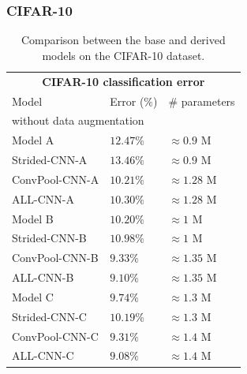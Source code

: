 \documentclass{article} %
\begin{document}
\subsubsection{CIFAR-10}
\begin{table}[h]
\caption{Comparison between the base and derived models on the CIFAR-10 dataset.}
\label{results-cifar10-base}
\begin{center}
\begin{tabular}{lll}
\multicolumn{3}{c}{\bf CIFAR-10 classification error} \\
\multicolumn{1}{l}{Model} & \multicolumn{1}{l}{Error ($\%$)} & \multicolumn{1}{l}{\# parameters} \\
\hline
\multicolumn{3}{l}{without data augmentation} \\
\hline
Model A         &  $12.47 \%$ & $\approx 0.9$ M \\
Strided-CNN-A         &  $13.46 \%$ & $\approx 0.9$ M \\
ConvPool-CNN-A         &  $\mathbf{10.21} \%$ & $\approx 1.28$ M \\
ALL-CNN-A         &  $10.30 \%$ & $\approx 1.28$ M \\
\hline
Model B         &  $10.20 \%$ & $\approx 1$ M \\
Strided-CNN-B         &  $10.98 \%$ & $\approx 1$ M \\
ConvPool-CNN-B         &  $9.33 \%$ & $\approx 1.35$ M \\
ALL-CNN-B         &  $\mathbf{9.10} \%$ & $\approx 1.35$ M \\
\hline
Model C         &  $9.74 \%$ & $\approx 1.3$ M \\
Strided-CNN-C         &  $10.19 \%$ & $\approx 1.3$ M \\
ConvPool-CNN-C         &  $9.31 \%$ & $\approx 1.4$ M \\
ALL-CNN-C         &  $\mathbf{9.08 \%}$ & $\approx 1.4$ M \\
\end{tabular}
\end{center}
\end{table}
\end{document}
